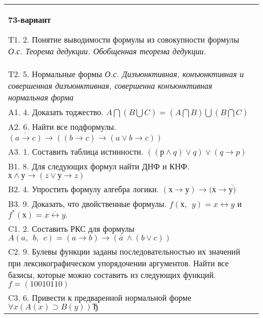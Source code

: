 \documentclass{article}
\begin{document}
\begin{tabular}{m{17cm}}
\textbf{73-вариант}
\newline

T1. 2. Понятие выводимости формулы из совокупности формулы \emph{О.с. Теорема дедукции. Обобщенная теорема дедукции.} \\
T2. 5. Нормальные формы \emph{О.с. Дизъюнктивная, конъюнктивная и совершенная дизъюнктивная, совершенна конъюнктивная нормальная форма} \\
A1. 4. Доказать тоджество. \(A\bigcap(B\bigcup C) = (A\bigcap B)\bigcup(B\bigcap C)\) \\
A2. 6. Найти все подформулы. \(\overline{(a \rightarrow c)} \rightarrow \left( (b \rightarrow c) \rightarrow (a \vee b \rightarrow c) \right)\) \\
A3. 1. Составить таблица истинности. \(\left( (р \land q) \vee q \right) \vee (q \rightarrow p)\) \\
B1. 8. Для следующих формул найти ДНФ и КНФ. \(х \land у \rightarrow (z \vee у \rightarrow z)\) \\
B2. 4. Упростить формулу алгебра логики. \((х \rightarrow у) \rightarrow (\overline{х} \rightarrow \overline{у)}\) \\
B3. 9. Доказать, что двойственные формулы. \(f(х,\ \ y) = x \leftrightarrow y\) и \(f^{*}(х) = \overline{x \leftrightarrow y}.\) \\
C1. 2. Составить РКС для формулы \(A(a,\ \ b,\ \ c) = (a \rightarrow b) \rightarrow (\overline{a}\  \land (b \vee c))\) \\
C2. 9. Булевы функции заданы последовательностью их значений при лексикографическом упорядочении аргументов. Найти все базисы, которые можно составить из следующих функций. \(f = (10010110)\) \\
C3. 6. Привести к предваренной нормальной форме \(\forall x(A(x) \supset B(y))Ђ\) \\

\end{tabular}
\vspace{1cm}
\end{document}
